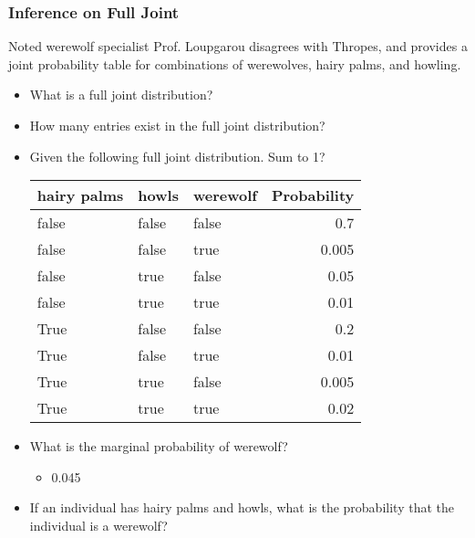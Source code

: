 \documentclass[compress, 9pt]{beamer}
\begin{document}
\begin{frame}
\frametitle{Inference on Full Joint}
\label{sec-2-2}

Noted werewolf specialist Prof. Loupgarou disagrees with Thropes, and 
provides a joint probability table for combinations of werewolves, 
hairy palms, and howling. 
\begin{itemize}

\item <2-> What is a full joint distribution?
\label{sec-2-2-1}%

\item <3-> How many entries exist in the full joint distribution?
\label{sec-2-2-2}%

\item <4-> Given the following full joint distribution. Sum to 1?\\
\label{sec-2-2-3}%
\begin{center}
\begin{tabular}{lllr}
 hairy palms  &  howls  &  werewolf  &  Probability  \\
\hline
 false        &  false  &  false     &          0.7  \\
 false        &  false  &  true      &        0.005  \\
 false        &  true   &  false     &         0.05  \\
 false        &  true   &  true      &         0.01  \\
 True         &  false  &  false     &          0.2  \\
 True         &  false  &  true      &         0.01  \\
 True         &  true   &  false     &        0.005  \\
 True         &  true   &  true      &         0.02  \\
\end{tabular}
\end{center}



\item <5-> What is the marginal probability of werewolf?
\label{sec-2-2-4}%
\begin{itemize}

\item <6-> 0.045
\label{sec-2-2-4-1}%
\end{itemize} %

\item <7-> If an individual has hairy palms and howls, what is the probability that the individual is a werewolf?
\label{sec-2-2-5}%
\begin{itemize}


\end{itemize}
\end{itemize}
\end{frame}
\end{document}
